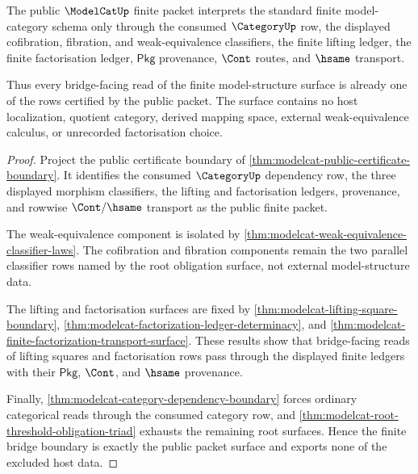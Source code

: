 \begin{theorem}
\label{thm:modelcat-finite-model-structure-bridge-boundary}
The public $\ModelCatUp$ finite packet interprets the standard finite
model-category schema only through the consumed $\CategoryUp$ row, the displayed
cofibration, fibration, and weak-equivalence classifiers, the finite lifting
ledger, the finite factorisation ledger, $\mathsf{Pkg}$ provenance, $\Cont$
routes, and $\hsame$ transport.

Thus every bridge-facing read of the finite model-structure surface is already
one of the rows certified by the public packet. The surface contains no host
localization, quotient category, derived mapping space, external
weak-equivalence calculus, or unrecorded factorisation choice.
\end{theorem}
\begin{proof}
Project the public certificate boundary of
\autoref{thm:modelcat-public-certificate-boundary}. It identifies the consumed
$\CategoryUp$ dependency row, the three displayed morphism classifiers, the
lifting and factorisation ledgers, provenance, and rowwise
$\Cont/\hsame$ transport as the public finite packet.

The weak-equivalence component is isolated by
\autoref{thm:modelcat-weak-equivalence-classifier-laws}. The cofibration and
fibration components remain the two parallel classifier rows named by the root
obligation surface, not external model-structure data.

The lifting and factorisation surfaces are fixed by
\autoref{thm:modelcat-lifting-square-boundary},
\autoref{thm:modelcat-factorization-ledger-determinacy}, and
\autoref{thm:modelcat-finite-factorization-transport-surface}. These results
show that bridge-facing reads of lifting squares and factorisation rows pass
through the displayed finite ledgers with their $\mathsf{Pkg}$, $\Cont$, and
$\hsame$ provenance.

Finally,
\autoref{thm:modelcat-category-dependency-boundary} forces ordinary
categorical reads through the consumed category row, and
\autoref{thm:modelcat-root-threshold-obligation-triad} exhausts the remaining
root surfaces. Hence the finite bridge boundary is exactly the public packet
surface and exports none of the excluded host data.
\end{proof}

